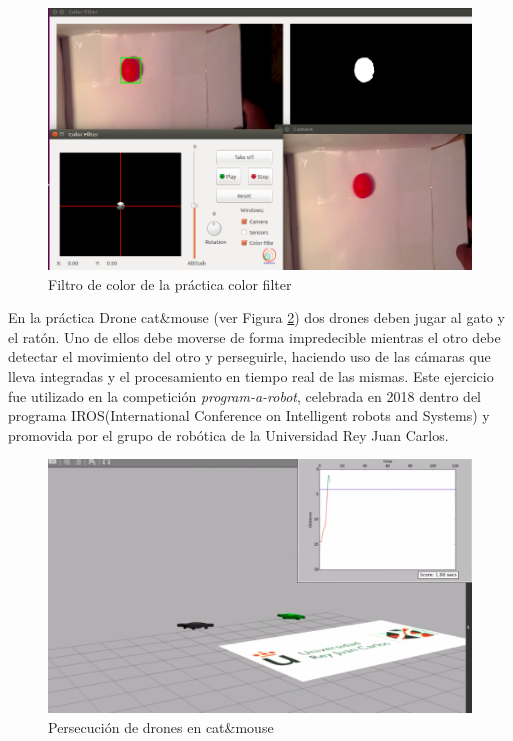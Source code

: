 \documentclass[12pt,spanish,chapterprefix, numbers=noenddot]{book}
\numberwithin{equation}{section}
\numberwithin{figure}{section}
\begin{document}
\begin{figure}[hbt!]
\centering
\includegraphics[width=12cm]{Figs/colorFilter.png}
\par
\caption{\label{fig:colorFilter}Filtro de color de la práctica color filter}
\end{figure}

En la práctica Drone cat\&mouse (ver Figura \ref{fig:catMouse}) dos drones deben jugar al gato y el ratón. Uno de ellos debe moverse de forma impredecible mientras el otro debe detectar el movimiento del otro y perseguirle, haciendo uso de las cámaras que lleva integradas y el procesamiento en tiempo real de las mismas. Este ejercicio fue utilizado en la competición \textit{program-a-robot}, celebrada en 2018 dentro del programa IROS(International Conference on Intelligent robots and Systems) y promovida por el grupo de robótica de la Universidad Rey Juan Carlos.

\begin{figure}[hbt!]
\centering
\includegraphics[width=12cm]{Figs/catMouse.png}
\par
\caption{\label{fig:catMouse}Persecución de drones en cat\&mouse}
\end{figure}
\end{document}
